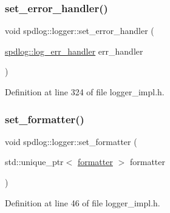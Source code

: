 \mbox{\label{classspdlog_1_1logger_aeeb9d71caa8f357f4255447fb72135d3}} 
\subsubsection{\texorpdfstring{set\+\_\+error\+\_\+handler()}{set\_error\_handler()}}
{\footnotesize\ttfamily void spdlog\+::logger\+::set\+\_\+error\+\_\+handler (\begin{DoxyParamCaption}\item[{\hyperlink{namespacespdlog_ad3ed787a29f245c833ef66faf48036e2}{spdlog\+::log\+\_\+err\+\_\+handler}}]{err\+\_\+handler }\end{DoxyParamCaption})\hspace{0.3cm}{\ttfamily [inline]}}



Definition at line 324 of file logger\+\_\+impl.\+h.

\mbox{\label{classspdlog_1_1logger_a9c5b880ddf9a9c86ec9893364e57071d}} 
\subsubsection{\texorpdfstring{set\+\_\+formatter()}{set\_formatter()}}
{\footnotesize\ttfamily void spdlog\+::logger\+::set\+\_\+formatter (\begin{DoxyParamCaption}\item[{std\+::unique\+\_\+ptr$<$ \hyperlink{classspdlog_1_1formatter}{formatter} $>$}]{formatter }\end{DoxyParamCaption})\hspace{0.3cm}{\ttfamily [inline]}}



Definition at line 46 of file logger\+\_\+impl.\+h.

